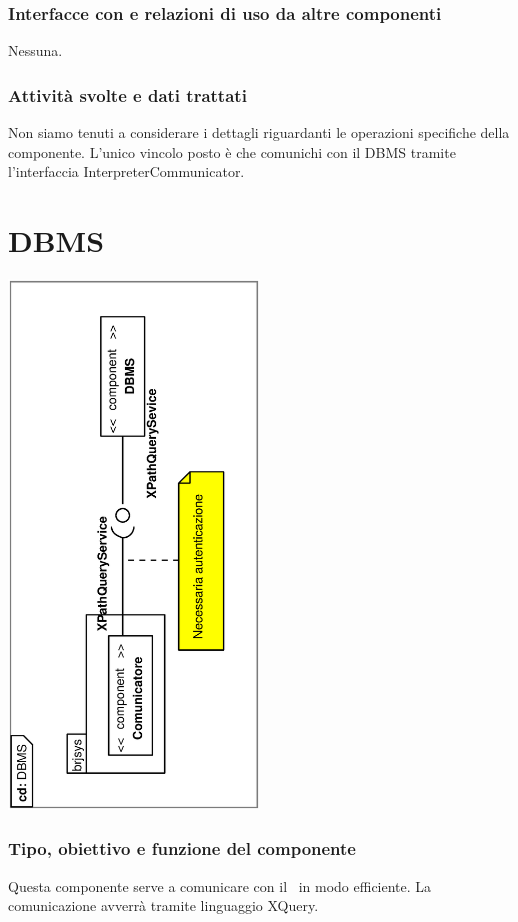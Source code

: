 \documentclass[11pt,titlepage,a4paper]{report}
\begin{document}
\subsubsection{Interfacce con e relazioni di uso da altre componenti}
Nessuna.
\subsubsection{Attivit\`a svolte e dati trattati}
Non siamo tenuti a considerare i dettagli riguardanti le operazioni specifiche della componente. L'unico vincolo posto \`e che comunichi con il DBMS tramite l'interfaccia InterpreterCommunicator.
\section{DBMS}
\begin{center}
 \includegraphics[width=0.5\textwidth, angle=-90]{DiagrammaClassi/DBMS.eps}
\end{center}
\subsubsection{Tipo, obiettivo e funzione del componente}
Questa componente serve a comunicare con il \re\ in modo efficiente. La comunicazione avverr\`a tramite linguaggio XQuery.
\end{document}
